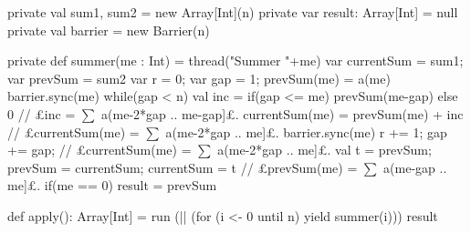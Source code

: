 \begin{answerI}
\begin{scala}
{  private val sum1, sum2 = new Array[Int](n) 
  private var result: Array[Int] = null
  private val barrier = new Barrier(n)

  private def summer(me : Int) = thread("Summer "+me){
    var currentSum = sum1; var prevSum = sum2
    var r = 0; var gap = 1; prevSum(me) = a(me)
    barrier.sync(me)
    while(gap < n){ 
      val inc = if(gap <= me) prevSum(me-gap) else 0  
      // £inc = $\sum$ a(me-2*gap .. me-gap]£.
      currentSum(me) = prevSum(me) + inc 
      // £currentSum(me) = $\sum$ a(me-2*gap .. me]£.
      barrier.sync(me)
      r += 1; gap += gap;        // £currentSum(me) = $\sum$ a(me-2*gap .. me]£.
      val t = prevSum; prevSum = currentSum; currentSum = t 
      // £prevSum(me) = $\sum$ a(me-gap .. me]£.
    }
    if(me == 0) result = prevSum
  }

  def apply(): Array[Int] = {
    run (|| (for (i <- 0 until n) yield summer(i)))
    result
  }
}
\end{scala}
\end{answerI}
